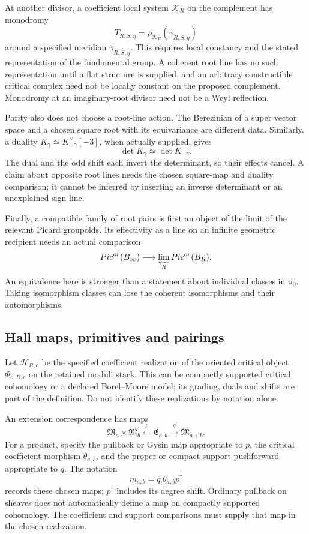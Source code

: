 At another divisor, a coefficient local system \(\mathcal K_R\)
on the complement has monodromy
\[
 T_{R,S,\eta}=\rho_{\mathcal K_R}(\gamma_{R,S,\eta})
\]
around a specified meridian \(\gamma_{R,S,\eta}\). This requires
local constancy and the stated representation of the fundamental
group. A coherent root line has no such representation until a
flat structure is supplied, and an arbitrary constructible critical
complex need not be locally constant on the proposed complement.
Monodromy at an imaginary-root divisor need not be a Weyl reflection.

Parity also does not choose a root-line action. The Berezinian of a
super vector space and a chosen square root with its equivariance
are different data. Similarly, a duality
\(K_\gamma\simeq K_{-\gamma}^{\vee}[-3]\), when actually
supplied, gives
\[
 \det K_\gamma\simeq\det K_{-\gamma}.
\]
The dual and the odd shift each invert the determinant, so their
effects cancel. A claim about opposite root lines needs the chosen
square-map and duality comparison; it cannot be inferred by
inserting an inverse determinant or an unexplained sign line.

Finally, a compatible family of root pairs is first an object of
the limit of the relevant Picard groupoids. Its effectivity as a
line on an infinite geometric recipient needs an actual comparison
\[
 \operatorname{Pic}^{or}(B_\infty)
       \longrightarrow\varprojlim_R\operatorname{Pic}^{or}(B_R).
\]
An equivalence here is stronger than a statement about individual
classes in \(\pi_0\). Taking isomorphism classes can lose the
coherent isomorphisms and their automorphisms.

\subsection{Hall maps, primitives and pairings}
\label{app:build-hall}

Let \(\mathcal H_{R,c}\) be the specified coefficient realization
of the oriented critical object \(\Phi_{o,R,c}\) on the retained
moduli stack. This can be compactly supported critical cohomology
or a declared Borel--Moore model; its grading, duals and shifts are
part of the definition. Do not identify these realizations by
notation alone.

An extension correspondence has maps
\[
 \mathfrak M_a\times\mathfrak M_b
       \xleftarrow{p}\mathfrak E_{a,b}\xrightarrow{q}
       \mathfrak M_{a+b}.
\]
For a product, specify the pullback or Gysin map appropriate to
\(p\), the critical coefficient morphism \(\theta_{a,b}\),
and the proper or compact-support pushforward appropriate to
\(q\). The notation
\[
 m_{a,b}=q_!\theta_{a,b}p^\dagger
\]
records these chosen maps; \(p^\dagger\) includes its degree
shift. Ordinary pullback on sheaves does not automatically define
a map on compactly supported cohomology. The coefficient and
support comparisons must supply that map in the chosen realization.

